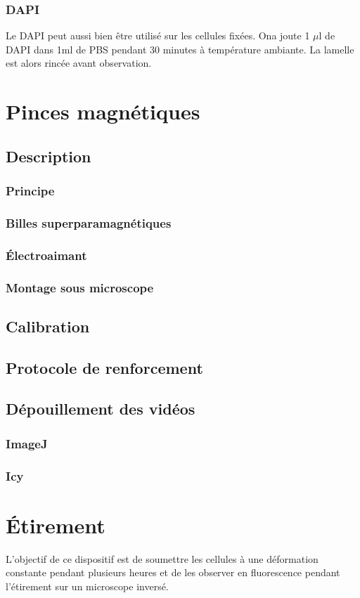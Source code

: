 \documentclass{report}
\begin{document}
		\subsubsection{DAPI}
		Le DAPI peut aussi bien être utilisé sur les cellules fixées. Ona joute 1  $\mu$l de DAPI dans 1ml de PBS pendant 30 minutes à température ambiante. La lamelle est alors rincée avant observation. 

\section{Pinces magnétiques}
	\subsection{Description}
		\subsubsection{Principe}
		\subsubsection{Billes superparamagnétiques}
		\subsubsection{\'Electroaimant}
		\subsubsection{Montage sous microscope}
	\subsection{Calibration}
	\subsection{Protocole de renforcement}
	\subsection{Dépouillement des vidéos}
		\subsubsection{ImageJ}
		\subsubsection{Icy}
\section{\'Etirement}
	L'objectif de ce dispositif est de soumettre les cellules à une déformation constante pendant plusieurs heures et de les observer en fluorescence pendant l'étirement sur un microscope inversé. 
\end{document}
